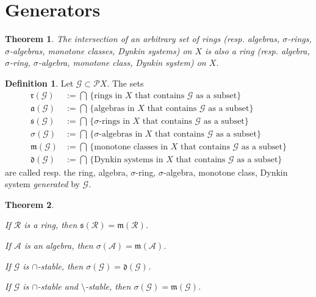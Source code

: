 \documentclass[11pt, a4paper, openany]{book}
\newtheorem{thm}{Theorem}\newtheorem{lem}{Lemma}\newtheorem{crl}{Corollary}
\theoremstyle{definition}
\newtheorem{define}{Definition}\newtheorem{exam}{Example}\newtheorem{remark}{Remark}
\newenvironment{tight_enumerate}{\begin{enumerate}\itemsep -0.2em}{\end{enumerate}}
\begin{document}
\section{Generators}
    \begin{thm}
        The intersection of an arbitrary set of rings (resp. algebras, $\sigma$-rings, $\sigma$-algebras, monotone classes, Dynkin systems) on $X$ is also a ring (resp. algebra, $\sigma$-ring, $\sigma$-algebra, monotone class, Dynkin system) on $X$.
    \end{thm}
    \begin{define}
        Let $\mathscr{G}\subset\mathscr{P}X$. The sets
        \begin{align*}
            \mathfrak{r}(\mathscr{G})&:=\bigcap\,\{\text{rings in }X\text{ that contains }\mathscr{G}\text{ as a subset}\}\\
            \mathfrak{a}(\mathscr{G})&:=\bigcap\,\{\text{algebras in }X\text{ that contains }\mathscr{G}\text{ as a subset}\}\\
            \mathfrak{s}(\mathscr{G})&:=\bigcap\,\{\sigma\text{-rings in }X\text{ that contains }\mathscr{G}\text{ as a subset}\}\\
            \sigma(\mathscr{G})&:=\bigcap\,\{\sigma\text{-algebras in }X\text{ that contains }\mathscr{G}\text{ as a subset}\}\\
            \mathfrak{m}(\mathscr{G})&:=\bigcap\,\{\text{monotone classes in }X\text{ that contains }\mathscr{G}\text{ as a subset}\}\\
            \mathfrak{d}(\mathscr{G})&:=\bigcap\,\{\text{Dynkin systems in }X\text{ that contains }\mathscr{G}\text{ as a subset}\}
        \end{align*}
        are called resp. the ring, algebra, $\sigma$-ring, $\sigma$-algebra, monotone class, Dynkin system \textit{generated} by $\mathscr{G}$.
    \end{define}
    \begin{thm}\label{generators}
        \begin{tight_enumerate}
            \item If $\mathscr{R}$ is a ring, then $\mathfrak{s}(\mathscr{R})=\mathfrak{m}(\mathscr{R})$.
            \item If $\mathscr{A}$ is an algebra, then $\sigma(\mathscr{A})=\mathfrak{m}(\mathscr{A})$.
            \item If $\mathscr{G}$ is $\cap$-stable, then $\sigma(\mathscr{G})=\mathfrak{d}(\mathscr{G})$.
            \item If $\mathscr{G}$ is $\cap$-stable and $\setminus$-stable, then $\sigma(\mathscr{G})=\mathfrak{m}(\mathscr{G})$.
        \end{tight_enumerate}
    \end{thm}
\end{document}
